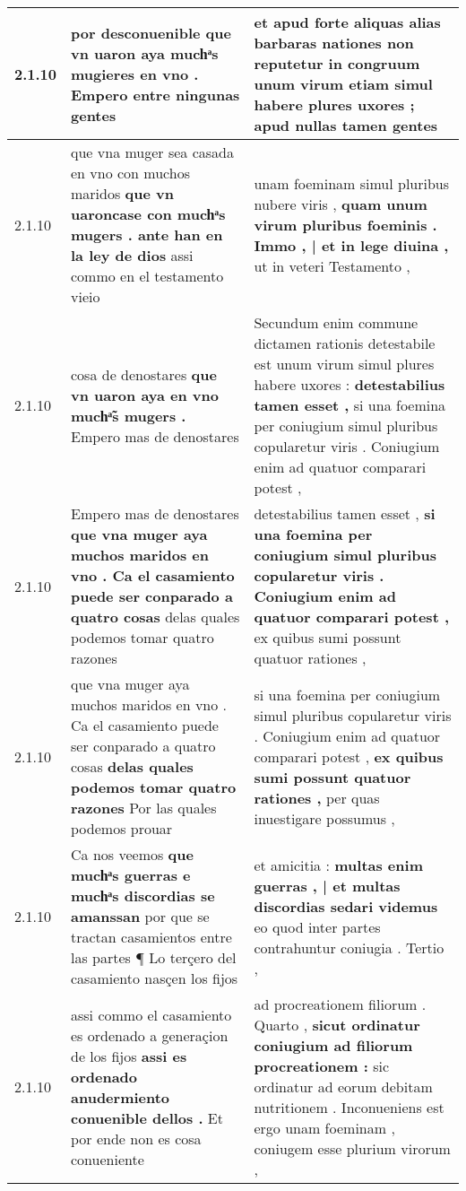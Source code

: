 \begin{tabular}{|p{1cm}|p{6.5cm}|p{6.5cm}|}
2.1.10 & por desconuenible \textbf{ que vn uaron aya muchͣs mugieres en vno . } Empero entre ningunas gentes & et apud forte aliquas alias barbaras nationes non reputetur in congruum unum virum \textbf{ etiam simul habere plures uxores ; } apud nullas tamen gentes \\\hline
2.1.10 & que vna muger sea casada en vno con muchos maridos \textbf{ que vn uaroncase con muchͣs mugers . ante han en la ley de dios } assi commo en el testamento vieio & unam foeminam simul pluribus nubere viris , \textbf{ quam unum virum pluribus foeminis . Immo , | et in lege diuina , } ut in veteri Testamento , \\\hline
2.1.10 & cosa de denostares \textbf{ que vn uaron aya en vno muchͣ̃s mugers . } Empero mas de denostares & Secundum enim commune dictamen rationis detestabile est unum virum simul plures habere uxores : \textbf{ detestabilius tamen esset , } si una foemina per coniugium simul pluribus copularetur viris . Coniugium enim ad quatuor comparari potest , \\\hline
2.1.10 & Empero mas de denostares \textbf{ que vna muger aya muchos maridos en vno . Ca el casamiento puede ser conparado a quatro cosas } delas quales podemos tomar quatro razones & detestabilius tamen esset , \textbf{ si una foemina per coniugium simul pluribus copularetur viris . Coniugium enim ad quatuor comparari potest , } ex quibus sumi possunt quatuor rationes , \\\hline
2.1.10 & que vna muger aya muchos maridos en vno . Ca el casamiento puede ser conparado a quatro cosas \textbf{ delas quales podemos tomar quatro razones } Por las quales podemos prouar & si una foemina per coniugium simul pluribus copularetur viris . Coniugium enim ad quatuor comparari potest , \textbf{ ex quibus sumi possunt quatuor rationes , } per quas inuestigare possumus , \\\hline
2.1.10 & Ca nos veemos \textbf{ que muchͣs guerras e muchͣs discordias se amanssan } por que se tractan casamientos entre las partes ¶ Lo terçero del casamiento nasçen los fijos & et amicitia : \textbf{ multas enim guerras , | et multas discordias sedari videmus } eo quod inter partes contrahuntur coniugia . Tertio , \\\hline
2.1.10 & assi commo el casamiento es ordenado a generaçion de los fijos \textbf{ assi es ordenado anudermiento conuenible dellos . } Et por ende non es cosa conueniente & ad procreationem filiorum . Quarto , \textbf{ sicut ordinatur coniugium ad filiorum procreationem : } sic ordinatur ad eorum debitam nutritionem . Inconueniens est ergo unam foeminam , coniugem esse plurium virorum , \\\hline

\end{tabular}
